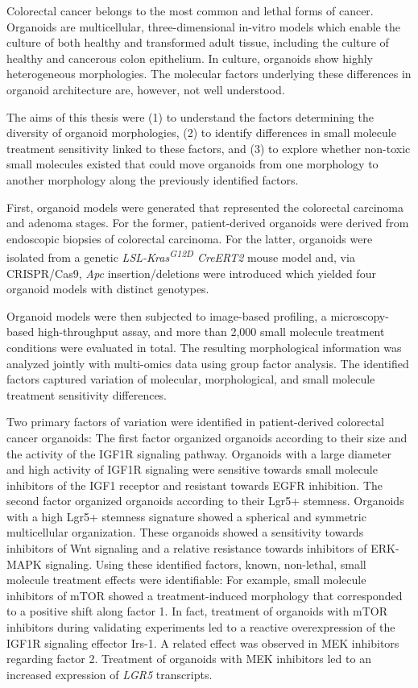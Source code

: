 Colorectal cancer belongs to the most common and lethal forms of cancer. Organoids are multicellular, three-dimensional in-vitro models which enable the culture of both healthy and transformed adult tissue, including the culture of healthy and cancerous colon epithelium. In culture, organoids show highly heterogeneous morphologies. The molecular factors underlying these differences in organoid architecture are, however, not well understood. 
\bigbreak

The aims of this thesis were (1) to understand the factors determining the diversity of organoid morphologies, (2) to identify differences in small molecule treatment sensitivity linked to these factors, and (3) to explore whether non-toxic small molecules existed that could move organoids from one morphology to another morphology along the previously identified factors.
\bigbreak

First, organoid models were generated that represented the colorectal carcinoma and adenoma stages. For the former, patient-derived organoids were derived from endoscopic biopsies of colorectal carcinoma. For the latter, organoids were isolated from a genetic \textit{LSL-Kras\textsuperscript{G12D} CreERT2} mouse model and, via CRISPR/Cas9, \textit{Apc} insertion/deletions were introduced which yielded four organoid models with distinct genotypes.
\bigbreak

Organoid models were then subjected to image-based profiling, a microscopy-based high-throughput assay, and more than 2,000 small molecule treatment conditions were evaluated in total. The resulting morphological information was analyzed jointly with multi-omics data using group factor analysis. The identified factors captured variation of molecular, morphological, and small molecule treatment sensitivity differences.
\bigbreak

Two primary factors of variation were identified in patient-derived colorectal cancer organoids: The first factor organized organoids according to their size and the activity of the IGF1R signaling pathway. Organoids with a large diameter and high activity of IGF1R signaling were sensitive towards small molecule inhibitors of the IGF1 receptor and resistant towards EGFR inhibition. 
\smallbreak
The second factor organized organoids according to their Lgr5+ stemness. Organoids with a high Lgr5+ stemness signature showed a spherical and symmetric multicellular organization. These organoids showed a sensitivity towards inhibitors of Wnt signaling and a relative resistance towards inhibitors of ERK-MAPK signaling.
\smallbreak
Using these identified factors, known, non-lethal, small molecule treatment effects were identifiable: For example, small molecule inhibitors of mTOR showed a treatment-induced morphology that corresponded to a positive shift along factor 1. In fact, treatment of organoids with mTOR inhibitors during validating experiments led to a reactive overexpression of the IGF1R signaling effector Irs-1. A related effect was observed in MEK inhibitors regarding factor 2. Treatment of organoids with MEK inhibitors led to an increased expression of \textit{LGR5} transcripts.
\bigbreak

